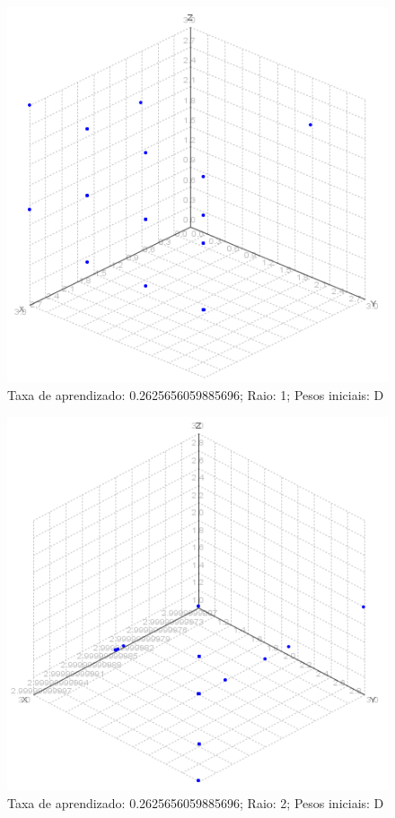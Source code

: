 \begin{figure}[ht!]
	\centering
	\includegraphics[scale=0.65]{./imgs/2d1.png}
	\caption{Taxa de aprendizado: 0.2625656059885696; Raio: 1; Pesos iniciais: D}
\end{figure}

\begin{figure}[ht!]
	\centering
	\includegraphics[scale=0.65]{./imgs/2d2.png}
	\caption{Taxa de aprendizado: 0.2625656059885696; Raio: 2; Pesos iniciais: D}
\end{figure}

